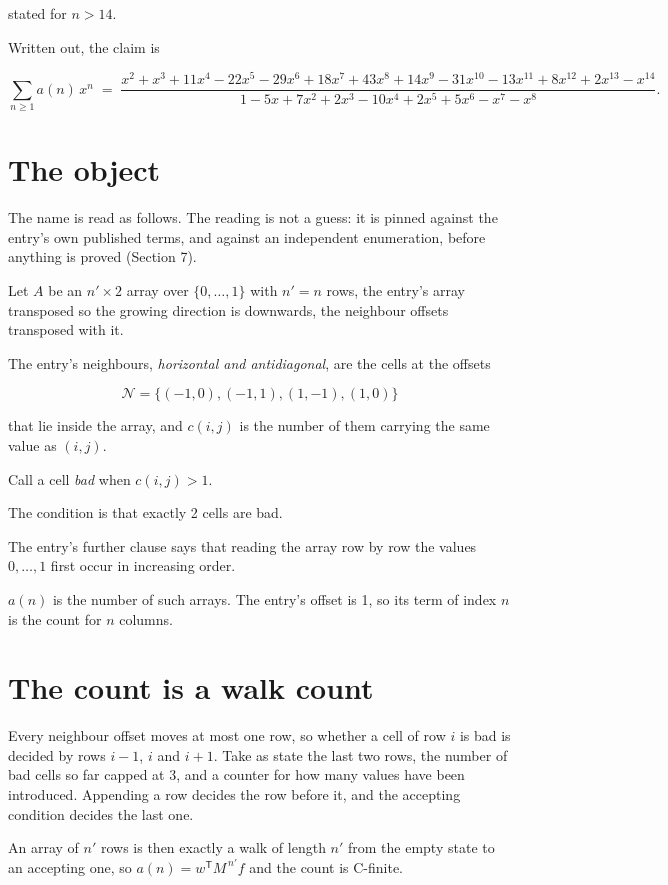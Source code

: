 \documentclass[11pt]{article}
\theoremstyle{definition}
\begin{document}
stated for $n > 14$.

Written out, the claim is

\[\sum_{n \ge 1} a(n)\,x^n \;=\; \frac{x^{2} + x^{3} + 11x^{4} - 22x^{5} - 29x^{6} + 18x^{7} + 43x^{8} + 14x^{9} - 31x^{10} - 13x^{11} + 8x^{12} + 2x^{13} - x^{14}}{1 - 5x + 7x^{2} + 2x^{3} - 10x^{4} + 2x^{5} + 5x^{6} - x^{7} - x^{8}}.\]

\section{The object}

The name is read as follows. The reading is not a guess: it is pinned against the entry's own published terms, and against an independent enumeration, before anything is proved (Section 7).

Let $A$ be an $n' \times 2$ array over $\{0,\dots,1\}$ with $n' = n$ rows, the entry's array transposed so the growing direction is downwards, the neighbour offsets transposed with it.

The entry's neighbours, {\itshape horizontal and antidiagonal}, are the cells at the offsets

\[\mathcal{N} = \{(-1,0), (-1,1), (1,-1), (1,0)\}\]

that lie inside the array, and $c(i,j)$ is the number of them carrying the same value as $(i,j)$.

Call a cell {\itshape bad} when $c(i,j) > 1$.

The condition is that exactly 2 cells are bad.

The entry's further clause says that reading the array row by row the values $0,\dots,1$ first occur in increasing order.

$a(n)$ is the number of such arrays. The entry's offset is 1, so its term of index $n$ is the count for $n$ columns.

\section{The count is a walk count}

Every neighbour offset moves at most one row, so whether a cell of row $i$ is bad is decided by rows $i-1$, $i$ and $i+1$. Take as state the last two rows, the number of bad cells so far capped at 3, and a counter for how many values have been introduced. Appending a row decides the row before it, and the accepting condition decides the last one.

An array of $n'$ rows is then exactly a walk of length $n'$ from the empty state to an accepting one, so $a(n) = w^{\mathsf T}M^{\,n'}f$ and the count is C-finite.
\end{document}
